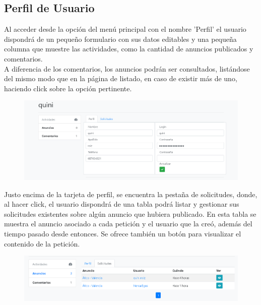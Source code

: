 \subsection{Perfil de Usuario}

Al acceder desde la opci\'{o}n del men\'{u} principal con el nombre 'Perfil' el usuario dispondr\'{a} de un peque\~{n}o formulario con sus datos editables y una peque\~{n}a columna que muestre las actividades, como la cantidad de anuncios publicados y comentarios. \\

A diferencia de los comentarios, los anuncios podr\'{a}n  ser consultados, list\'{a}ndose del mismo modo que en la p\'{a}gina de listado, en caso de existir m\'{a}s de uno, haciendo click sobre la opci\'{o}n pertinente. 


\begin{figure}[h!]
\centering
\includegraphics[width=1\textwidth]{Img/ManualUsuario/USER_PROFILE_EDIT.png}
\end{figure}

Justo encima de la tarjeta de perfil, se encuentra la pesta\~{n}a de solicitudes, donde, al hacer click,  el usuario dispondr\'{a} de una tabla  podr\'{a} listar y gestionar sus solicitudes existentes sobre alg\'{u}n anuncio que hubiera publicado. En esta tabla se muestra el anuncio asociado a cada petici\'{o}n y el usuario que la cre\'{o}, adem\'{a}s del tiempo pasado desde entonces. Se ofrece tambi\'{e}n un bot\'{o}n para visualizar el contenido de la petici\'{o}n.

\begin{figure}[h!]
\centering
\includegraphics[width=1\textwidth]{Img/ManualUsuario/USER_REQUESTS.png}
\end{figure}

